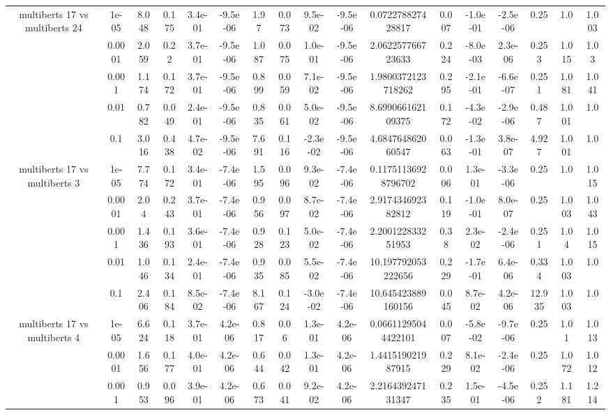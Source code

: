 \begin{tabular}{|c|c|c|c|c|c|c|c|c|c|c|c|c|c|c|c|c|}
\hline
\multirow{5}{*}{multiberts 17 vs multiberts 24} & 1e-05 & 8.048 & 0.175 & 3.4e-01 & -9.5e-06 & 1.97 & 0.073 & 9.5e-02 & -9.5e-06 & 0.072278827428817 & 0.007 & -1.0e-01 & -2.5e-06 & 0.25 & 1.0 & 1.003 \\
 & 0.0001 & 2.059 & 0.22 & 3.7e-01 & -9.5e-06 & 1.087 & 0.075 & 1.0e-01 & -9.5e-06 & 2.062257766723633 & 0.224 & -8.0e-03 & 2.3e-06 & 0.253 & 1.015 & 1.03 \\
 & 0.001 & 1.174 & 0.172 & 3.7e-01 & -9.5e-06 & 0.899 & 0.059 & 7.1e-02 & -9.5e-06 & 1.9800372123718262 & 0.295 & -2.1e-01 & -6.6e-07 & 0.251 & 1.081 & 1.041 \\
 & 0.01 & 0.782 & 0.049 & 2.4e-01 & -9.5e-06 & 0.835 & 0.061 & 5.0e-02 & -9.5e-06 & 8.699066162109375 & 0.172 & -4.3e-02 & -2.9e-06 & 0.487 & 1.001 & 1.0 \\
 & 0.1 & 3.016 & 0.438 & 4.7e-02 & -9.5e-06 & 7.691 & 0.116 & -2.3e-02 & -9.5e-06 & 4.684764862060547 & 0.063 & -1.3e-01 & 3.8e-07 & 4.927 & 1.001 & 1.0 \\
\hline
\multirow{5}{*}{multiberts 17 vs multiberts 3} & 1e-05 & 7.774 & 0.172 & 3.4e-01 & -7.4e-06 & 1.595 & 0.096 & 9.3e-02 & -7.4e-06 & 0.11751136928796702 & 0.006 & 1.3e-01 & -3.3e-06 & 0.25 & 1.0 & 1.015 \\
 & 0.0001 & 2.04 & 0.243 & 3.7e-01 & -7.4e-06 & 0.956 & 0.097 & 8.7e-02 & -7.4e-06 & 2.917434692382812 & 0.119 & -1.0e-01 & 8.0e-07 & 0.25 & 1.003 & 1.043 \\
 & 0.001 & 1.436 & 0.193 & 3.6e-01 & -7.4e-06 & 0.928 & 0.123 & 5.0e-02 & -7.4e-06 & 2.200122833251953 & 0.38 & 2.3e-02 & -2.4e-06 & 0.251 & 1.04 & 1.015 \\
 & 0.01 & 1.046 & 0.134 & 2.4e-01 & -7.4e-06 & 0.935 & 0.085 & 5.5e-02 & -7.4e-06 & 10.197792053222656 & 0.229 & -1.7e-01 & 6.4e-06 & 0.334 & 1.003 & 1.0 \\
 & 0.1 & 2.406 & 0.184 & 8.5e-02 & -7.4e-06 & 8.167 & 0.124 & -3.0e-02 & -7.4e-06 & 10.645423889160156 & 0.045 & 8.7e-02 & 4.2e-06 & 12.935 & 1.003 & 1.0 \\
\hline
\multirow{5}{*}{multiberts 17 vs multiberts 4} & 1e-05 & 6.624 & 0.118 & 3.7e-01 & 4.2e-06 & 0.817 & 0.06 & 1.3e-01 & 4.2e-06 & 0.06611295044422101 & 0.007 & -5.8e-02 & -9.7e-06 & 0.25 & 1.01 & 1.013 \\
 & 0.0001 & 1.656 & 0.177 & 4.0e-01 & 4.2e-06 & 0.644 & 0.042 & 1.3e-01 & 4.2e-06 & 1.441519021987915 & 0.229 & 8.1e-02 & -2.4e-06 & 0.25 & 1.072 & 1.012 \\
 & 0.001 & 0.953 & 0.096 & 3.9e-01 & 4.2e-06 & 0.673 & 0.041 & 9.2e-02 & 4.2e-06 & 2.216439247131347 & 0.235 & 1.5e-01 & -4.5e-06 & 0.252 & 1.181 & 1.214 \\

\end{tabular}
